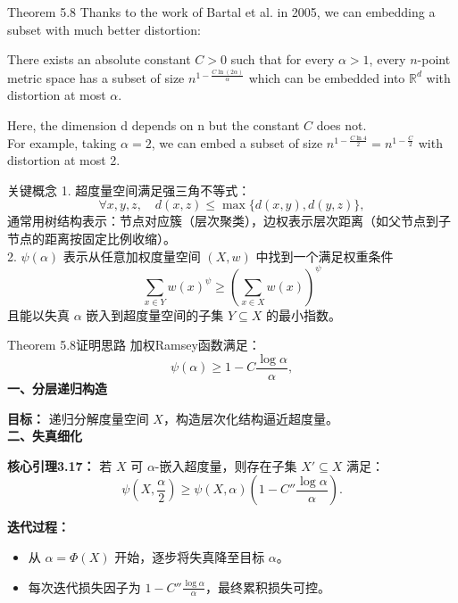 \documentclass[xcolor=dvipsnames]{beamer}
\theoremstyle{remark}
\begin{document}
\begin{frame}{Theorem 5.8}
   Thanks to the work of Bartal et al. in 2005, we can embedding a subset with much better distortion:\\
    \begin{theorem}
      There exists an absolute constant $C > 0$ such that for every $\alpha > 1$, every $n$-point metric space has a subset of size $n^{1 - \frac{C \ln(2\alpha)}{\alpha}}$ which can be embedded into $\mathbb{R}^d$ with distortion at most $\alpha$.
    \end{theorem}
    Here, the dimension d depends on n but the constant $C$ does not.\\
    For example, taking $\alpha = 2$, we can embed a subset of size $n^{1 - \frac{C \ln 4}{2}} = n^{1 - \frac{C}{2}}$ with distortion at most 2.\\
\end{frame}
\begin{frame}{关键概念}
 1. 超度量空间满足强三角不等式：
 \[
 \forall x, y, z,\quad d(x, z) \leq \max\{d(x, y), d(y, z)\},
 \]
 通常用树结构表示：节点对应簇（层次聚类），边权表示层次距离（如父节点到子节点的距离按固定比例收缩）。\\
 2. \(\psi(\alpha)\) 表示从任意加权度量空间 \((X, w)\) 中找到一个满足权重条件
\[
\sum_{x \in Y} w(x)^{\psi} \geq \left( \sum_{x \in X} w(x) \right)^{\psi}
\]
且能以失真 \(\alpha\) 嵌入到超度量空间的子集 \(Y \subseteq X\) 的最小指数。\\

\end{frame}
\begin{frame}{Theorem 5.8证明思路}
  加权Ramsey函数满足：
\[
\psi(\alpha) \geq 1 - C \frac{\log \alpha}{\alpha},
\]
  \textbf{一、分层递归构造}  
  \vspace{0.1cm}
  
  \textbf{目标：} 递归分解度量空间 \( X \)，构造层次化结构逼近超度量。\\
  \textbf{\large 二、失真细化}  
  \vspace{0.1cm}
  
  \textbf{核心引理3.17：} 若 \( X \) 可 \( \alpha \)-嵌入超度量，则存在子集 \( X' \subseteq X \) 满足：
  \[
  \psi\left(X, \frac{\alpha}{2}\right) \geq \psi(X, \alpha) \left(1 - C'' \frac{\log \alpha}{\alpha}\right).
  \]
  
  \textbf{迭代过程：}
  \begin{itemize}
      \item 从 \( \alpha = \Phi(X) \) 开始，逐步将失真降至目标 \( \alpha \)。
      \item 每次迭代损失因子为 \( 1 - C'' \frac{\log \alpha}{\alpha} \)，最终累积损失可控。
  \end{itemize}
   \end{frame}
    
\end{document}
